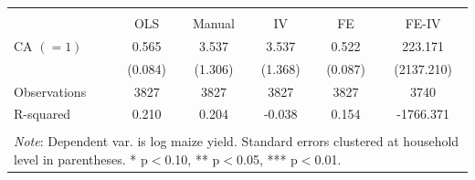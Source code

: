 \begin{tabular}{l*{5}{c}} 
\\[-1.8ex]\hline \hline \\[-1.8ex] 
& \multicolumn{1}{c}{OLS} & 
\multicolumn{1}{c}{Manual} & 
\multicolumn{1}{c}{IV} & 
\multicolumn{1}{c}{FE} & 
\multicolumn{1}{c}{FE-IV} 
\\ \midrule
\midrule
\hspace{0.1cm} CA $(=1)$&       0.565\sym{***}&       3.537\sym{***}&       3.537\sym{***}&       0.522\sym{***}&     223.171         \\
                    &     (0.084)         &     (1.306)         &     (1.368)         &     (0.087)         &  (2137.210)         \\
\midrule
Observations        &        3827         &        3827         &        3827         &        3827         &        3740         \\
R-squared           &       0.210         &       0.204         &      -0.038         &       0.154         &   -1766.371         \\
\hline \hline \\[-1.8ex] 
\multicolumn{6}{p{\linewidth}}{\small 
\noindent \textit{Note}: Dependent var. 
is log maize yield. Standard errors 
clustered at household level in 
parentheses. 
* p$<$0.10, ** p$<$0.05, *** p$<$0.01.} 
\end{tabular}
